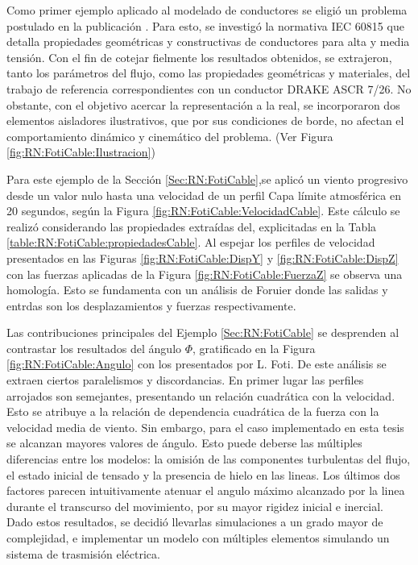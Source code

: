  Como primer ejemplo aplicado al modelado de conductores se eligió un problema postulado en la publicación \citep{Foti2016}. Para esto, se investigó la normativa IEC 60815 que detalla propiedades geométricas y constructivas de conductores para alta y media tensión.  Con el fin de cotejar fielmente los resultados obtenidos, se extrajeron, tanto los parámetros del flujo, como las propiedades geométricas y materiales, del trabajo de referencia correspondientes con un conductor DRAKE ASCR 7/26. No obstante, con el objetivo acercar la representación a la real, se incorporaron dos elementos aisladores ilustrativos, que por sus condiciones de borde, no afectan el comportamiento dinámico y cinemático del problema. (Ver Figura \ref{fig:RN:FotiCable:Ilustracion})
 
 Para este ejemplo de la Sección \ref{Sec:RN:FotiCable},se aplicó un viento progresivo desde un valor nulo hasta una velocidad de un perfil Capa límite atmosférica en 20 segundos, según la Figura \ref{fig:RN:FotiCable:VelocidadCable}. Este cálculo se realizó considerando las propiedades extraídas del\citep{IEC60826}, explicitadas en la Tabla \ref{table:RN:FotiCable:propiedadesCable}. Al espejar los perfiles de velocidad presentados en las Figuras \ref{fig:RN:FotiCable:DispY} y \ref{fig:RN:FotiCable:DispZ} con las fuerzas aplicadas de la Figura \ref{fig:RN:FotiCable:FuerzaZ} se observa una homología. Esto se fundamenta con un análisis de Foruier donde las salidas y entrdas son los desplazamientos y fuerzas respectivamente. 
 
 Las contribuciones principales del Ejemplo \ref{Sec:RN:FotiCable} se desprenden al contrastar los resultados del ángulo $\Phi$, gratificado en la Figura \ref{fig:RN:FotiCable:Angulo} con los presentados por L. Foti. De este análisis se extraen ciertos paralelismos y discordancias. En primer lugar las perfiles arrojados son semejantes, presentando un relación cuadrática con la velocidad. Esto se atribuye a la relación de dependencia cuadrática de la fuerza con la velocidad media de viento. Sin embargo, para el caso implementado en esta tesis se alcanzan mayores valores de ángulo. Esto puede deberse las múltiples diferencias entre los modelos: la omisión de las componentes turbulentas del flujo, el estado inicial de tensado y la presencia de hielo en las lineas. Los últimos dos factores parecen intuitivamente atenuar el angulo máximo alcanzado por la linea durante el transcurso del movimiento, por su mayor rigidez inicial e inercial. Dado estos resultados, se decidió llevarlas simulaciones a un grado mayor de complejidad, e implementar un modelo con múltiples elementos simulando un sistema de trasmisión eléctrica.  
 

